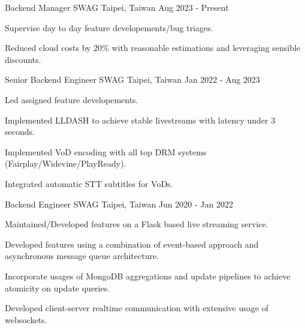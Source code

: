 

\begin{cventries}

  \cventry
    {Backend Manager} %
    {SWAG} %
    {Taipei, Taiwan} %
    {Aug 2023 - Present} %
    {
      \begin{cvitems} %
        \item {Supervise day to day feature developements/bug triages. }
        \item {Reduced cloud costs by 20\% with reasonable estimations and leveraging sensible discounts. }
      \end{cvitems}
    }
    {Senior Backend Engineer} %
    {SWAG} %
    {Taipei, Taiwan} %
    {Jan 2022 - Aug 2023} %
    {
      \begin{cvitems} %
        \item {Led assigned feature developements. }
        \item {Implemented LLDASH to achieve stable livestreams with latency under 3 seconds. }
        \item {Implemented VoD encoding with all top DRM systems (Fairplay/Widevine/PlayReady). }
        \item {Integrated automatic STT subtitles for VoDs. }
      \end{cvitems}
    }
    {Backend Engineer} %
    {SWAG} %
    {Taipei, Taiwan} %
    {Jun 2020 - Jan 2022} %
    {
      \begin{cvitems} %
        \item {Maintained/Developed features on a Flask based live streaming service. }
        \item {Developed features using a combination of event-based approach and asynchronous message queue architecture. }
        \item {Incorporate usages of MongoDB aggregations and update pipelines to achieve atomicity on update queries. }
        \item {Developed client-server realtime communication with extensive usage of websockets. }

\end{cvitems}}
\end{cventries}

